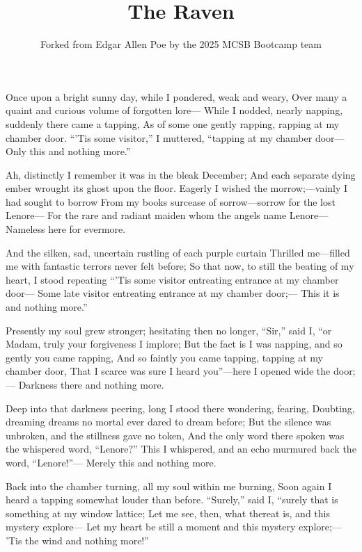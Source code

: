 \documentclass{article}
\title{The Raven}
\author{Forked from Edgar Allen Poe by the 2025 MCSB Bootcamp team}
\begin{document}
\maketitle 

Once upon a bright sunny day, while I pondered, weak and weary,
Over many a quaint and curious volume of forgotten lore—
    While I nodded, nearly napping, suddenly there came a tapping,
As of some one gently rapping, rapping at my chamber door.
``'Tis some visitor,” I muttered, “tapping at my chamber door—
            Only this and nothing more.”

    Ah, distinctly I remember it was in the bleak December;
And each separate dying ember wrought its ghost upon the floor.
    Eagerly I wished the morrow;—vainly I had sought to borrow
    From my books surcease of sorrow—sorrow for the lost Lenore—
For the rare and radiant maiden whom the angels name Lenore—
            Nameless here for evermore.

    And the silken, sad, uncertain rustling of each purple curtain
Thrilled me—filled me with fantastic terrors never felt before;
    So that now, to still the beating of my heart, I stood repeating
    ``'Tis some visitor entreating entrance at my chamber door—
Some late visitor entreating entrance at my chamber door;—
            This it is and nothing more.”

    Presently my soul grew stronger; hesitating then no longer,
    ``Sir,” said I, ``or Madam, truly your forgiveness I implore;
    But the fact is I was napping, and so gently you came rapping,
    And so faintly you came tapping, tapping at my chamber door,
That I scarce was sure I heard you”—here I opened wide the door;—
            Darkness there and nothing more.

    Deep into that darkness peering, long I stood there wondering, fearing,
Doubting, dreaming dreams no mortal ever dared to dream before;
    But the silence was unbroken, and the stillness gave no token,
    And the only word there spoken was the whispered word, “Lenore?”
This I whispered, and an echo murmured back the word, ``Lenore!”—
            Merely this and nothing more.

    Back into the chamber turning, all my soul within me burning,
Soon again I heard a tapping somewhat louder than before.
``Surely,” said I, “surely that is something at my window lattice;
      Let me see, then, what thereat is, and this mystery explore—
Let my heart be still a moment and this mystery explore;—
'Tis the wind and nothing more!”
\end{document}
